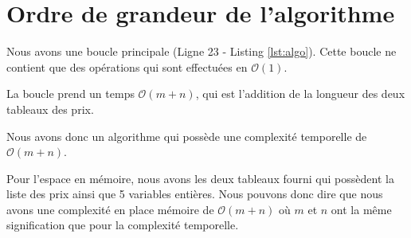 \documentclass[11pt]{article}
\begin{document}
\section{Ordre de grandeur de l'algorithme}

Nous avons une boucle principale (Ligne 23 - Listing \ref{lst:algo}). Cette boucle ne contient que des opérations qui sont effectuées en $\mathcal{O}(1)$.

La boucle prend un temps $\mathcal{O}(m + n)$, qui est l'addition de la longueur des deux tableaux des prix.

Nous avons donc un algorithme qui possède une complexité temporelle de $\mathcal{O}(m + n)$.

Pour l'espace en mémoire, nous avons les deux tableaux fourni qui possèdent la liste des prix ainsi que 5 variables entières.
Nous pouvons donc dire que nous avons une complexité en place mémoire de  $\mathcal{O}(m + n)$ où $m$ et $n$ ont la même signification que pour la complexité temporelle.
\end{document}
